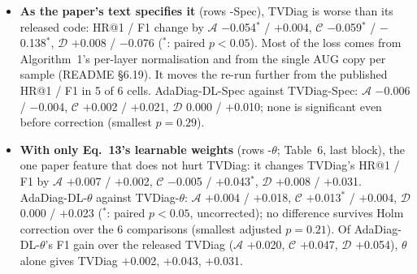 \documentclass[10pt]{article}
\begin{document}
\begin{itemize}
\item \textbf{As the paper's text specifies it} (rows -Spec), TVDiag is worse than its released code: HR@1 / F1 change by $\mathcal{A}$ $-$0.054$^{*}$ / $+$0.004, $\mathcal{C}$ $-$0.059$^{*}$ / $-$0.138$^{*}$, $\mathcal{D}$ $+$0.008 / $-$0.076 ($^{*}$: paired $p<0.05$). Most of the loss comes from Algorithm~1's per-layer normalisation and from the single AUG copy per sample (README \S6.19). It moves the re-run further from the published HR@1 / F1 in 5 of 6 cells. AdaDiag-DL-Spec against TVDiag-Spec: $\mathcal{A}$ $-$0.006 / $-$0.004, $\mathcal{C}$ $+$0.002 / $+$0.021, $\mathcal{D}$ 0.000 / $+$0.010; none is significant even before correction (smallest $p=0.29$).
\item \textbf{With only Eq.~13's learnable weights} (rows -$\theta$; Table~6, last block), the one paper feature that does not hurt TVDiag: it changes TVDiag's HR@1 / F1 by $\mathcal{A}$ $+$0.007 / $+$0.002, $\mathcal{C}$ $-$0.005 / $+$0.043$^{*}$, $\mathcal{D}$ $+$0.008 / $+$0.031. AdaDiag-DL-$\theta$ against TVDiag-$\theta$: $\mathcal{A}$ $+$0.004 / $+$0.018, $\mathcal{C}$ $+$0.013$^{*}$ / $+$0.004, $\mathcal{D}$ 0.000 / $+$0.023 ($^{*}$: paired $p<0.05$, uncorrected); no difference survives Holm correction over the 6 comparisons (smallest adjusted $p=0.21$). Of AdaDiag-DL-$\theta$'s F1 gain over the released TVDiag ($\mathcal{A}$ $+$0.020, $\mathcal{C}$ $+$0.047, $\mathcal{D}$ $+$0.054), $\theta$ alone gives TVDiag $+$0.002, $+$0.043, $+$0.031.
\end{itemize}

\setcounter{table}{5}

\end{document}
